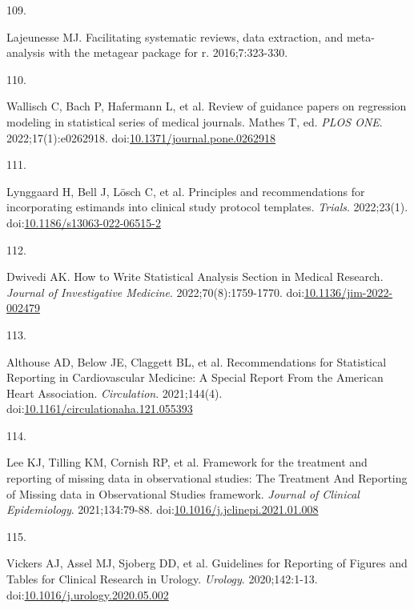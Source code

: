 \documentclass[
]{book}
\newlength{\cslhangindent}
\newlength{\csllabelwidth}
\newlength{\cslentryspacingunit} %
\newenvironment{CSLReferences}[2] %
 {%
  \setlength{\parindent}{0pt}
  \ifodd #1
  \let\oldpar\par
  \def\par{\hangindent=\cslhangindent\oldpar}
  \fi
  \setlength{\parskip}{#2\cslentryspacingunit}
 }%
 {}
\newcommand{\CSLLeftMargin}[1]{\parbox[t]{\csllabelwidth}{#1}}
\newcommand{\CSLRightInline}[1]{\parbox[t]{\linewidth - \csllabelwidth}{#1}\break}
\begin{document}
\begin{CSLReferences}{0}{0}
\leavevmode{}%
\CSLLeftMargin{109. }%
\CSLRightInline{Lajeunesse MJ. Facilitating systematic reviews, data extraction, and meta-analysis with the metagear package for r. 2016;7:323-330.}

\leavevmode{}%
\CSLLeftMargin{110. }%
\CSLRightInline{Wallisch C, Bach P, Hafermann L, et al. Review of guidance papers on regression modeling in statistical series of medical journals. Mathes T, ed. \emph{PLOS ONE}. 2022;17(1):e0262918. doi:\href{https://doi.org/10.1371/journal.pone.0262918}{10.1371/journal.pone.0262918}}

\leavevmode{}%
\CSLLeftMargin{111. }%
\CSLRightInline{Lynggaard H, Bell J, Lösch C, et al. Principles and recommendations for incorporating estimands into clinical study protocol templates. \emph{Trials}. 2022;23(1). doi:\href{https://doi.org/10.1186/s13063-022-06515-2}{10.1186/s13063-022-06515-2}}

\leavevmode{}%
\CSLLeftMargin{112. }%
\CSLRightInline{Dwivedi AK. How to Write Statistical Analysis Section in Medical Research. \emph{Journal of Investigative Medicine}. 2022;70(8):1759-1770. doi:\href{https://doi.org/10.1136/jim-2022-002479}{10.1136/jim-2022-002479}}

\leavevmode{}%
\CSLLeftMargin{113. }%
\CSLRightInline{Althouse AD, Below JE, Claggett BL, et al. Recommendations for Statistical Reporting in Cardiovascular Medicine: A Special Report From the American Heart Association. \emph{Circulation}. 2021;144(4). doi:\href{https://doi.org/10.1161/circulationaha.121.055393}{10.1161/circulationaha.121.055393}}

\leavevmode{}%
\CSLLeftMargin{114. }%
\CSLRightInline{Lee KJ, Tilling KM, Cornish RP, et al. Framework for the treatment and reporting of missing data in observational studies: The Treatment And Reporting of Missing data in Observational Studies framework. \emph{Journal of Clinical Epidemiology}. 2021;134:79-88. doi:\href{https://doi.org/10.1016/j.jclinepi.2021.01.008}{10.1016/j.jclinepi.2021.01.008}}

\leavevmode{}%
\CSLLeftMargin{115. }%
\CSLRightInline{Vickers AJ, Assel MJ, Sjoberg DD, et al. Guidelines for Reporting of Figures and Tables for Clinical Research in Urology. \emph{Urology}. 2020;142:1-13. doi:\href{https://doi.org/10.1016/j.urology.2020.05.002}{10.1016/j.urology.2020.05.002}}


\end{CSLReferences}
\end{document}
